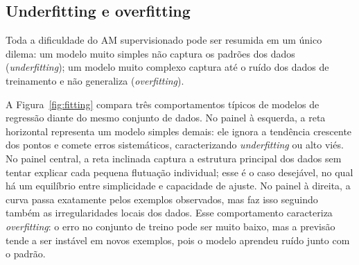 \documentclass[12pt,a4paper]{article}
\begin{document}
\subsection{Underfitting e overfitting}
\label{subsec:fitting}

Toda a dificuldade do AM supervisionado pode ser resumida em um único dilema: um modelo muito simples não captura os padrões dos dados (\emph{underfitting}); um modelo muito complexo captura até o ruído dos dados de treinamento e não generaliza (\emph{overfitting}).

A Figura~\ref{fig:fitting} compara três comportamentos típicos de modelos de regressão diante do mesmo conjunto de dados. No painel à esquerda, a reta horizontal representa um modelo simples demais: ele ignora a tendência crescente dos pontos e comete erros sistemáticos, caracterizando \textit{underfitting} ou alto viés. No painel central, a reta inclinada captura a estrutura principal dos dados sem tentar explicar cada pequena flutuação individual; esse é o caso desejável, no qual há um equilíbrio entre simplicidade e capacidade de ajuste. No painel à direita, a curva passa exatamente pelos exemplos observados, mas faz isso seguindo também as irregularidades locais dos dados. Esse comportamento caracteriza \textit{overfitting}: o erro no conjunto de treino pode ser muito baixo, mas a previsão tende a ser instável em novos exemplos, pois o modelo aprendeu ruído junto com o padrão.
\end{document}
